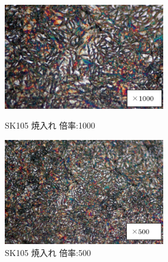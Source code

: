 \documentclass[10pt，a4j]{jsarticle}
\begin{document}
  \begin{figure}[htbp]
    \begin{minipage}{0.5\hsize}
      \begin{center}
        \includegraphics[width=7cm]{../img/SK105_yakiire_1000.png}
        \caption{SK105 焼入れ 倍率:1000}
      \end{center}
    \end{minipage}
    \begin{minipage}{0.5\hsize}
      \begin{center}
        \includegraphics[width=7cm]{../img/SK105_yakiire_500.png}
        \caption{SK105 焼入れ 倍率:500}
      \end{center}
    \end{minipage}
  \end{figure}
\end{document}
